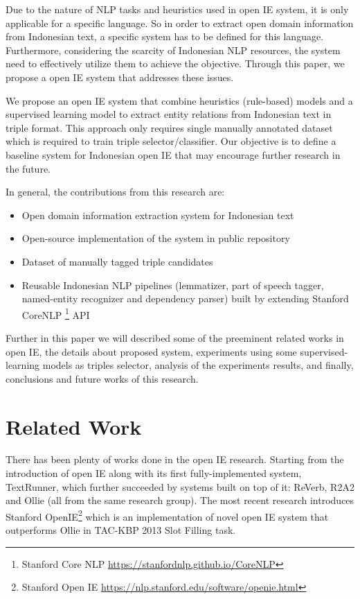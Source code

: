\documentclass[conference,compsoc,12pt]{IEEEtran}
\begin{document}
Due to the nature of NLP tasks and heuristics used in open IE system, it is only applicable for a specific language\cite{banko2007open}. So in order to extract open domain information from Indonesian text, a specific system has to be defined for this language. Furthermore, considering the scarcity of Indonesian NLP resources, the system need to effectively utilize them to achieve the objective. Through this paper, we propose a open IE system that addresses these issues.

We propose an open IE system that combine heuristics (rule-based) models and a supervised learning model to extract entity relations from Indonesian text in triple format. This approach only requires single manually annotated dataset which is required to train triple selector/classifier. Our objective is to define a baseline system for Indonesian open IE that may encourage further research in the future.

In general, the contributions from this research are:

\begin{itemize}
\item Open domain information extraction system for Indonesian text
\item Open-source implementation of the system in public repository
\item Dataset of manually tagged triple candidates
\item Reusable Indonesian NLP pipelines (lemmatizer, part of speech tagger, named-entity recognizer and dependency parser) built by extending Stanford CoreNLP \footnote{Stanford Core NLP \url{https://stanfordnlp.github.io/CoreNLP}} API
\end{itemize}

Further in this paper we will described some of the preeminent related works in open IE, the details about proposed system, experiments using some supervised-learning models as triples selector, analysis of the experiments results, and finally, conclusions and future works of this research.

\section{Related Work}

There has been plenty of works done in the open IE research. Starting from the introduction of open IE along with its first fully-implemented system, TextRunner\cite{banko2007open}, which further succeeded by systems built on top of it: ReVerb, R2A2\cite{etzioni2011open} and Ollie\cite{schmitz2012open} (all from the same research group). The most recent research introduces Stanford OpenIE\footnote{Stanford Open IE \url{https://nlp.stanford.edu/software/openie.html}} which is an implementation of novel open IE system that outperforms Ollie in TAC-KBP
2013 Slot Filling task\cite{angeli2015leveraging}.
\end{document}
